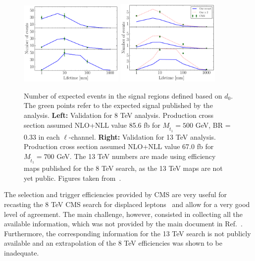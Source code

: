 \begin{figure}[ht]
\centering
\includegraphics[width=0.45\textwidth,angle=0]{ch5-figures/disp_lep_8tev.pdf}
\includegraphics[width=0.45\textwidth,angle=0]{ch5-figures/disp_lep_13tev.pdf}


\caption{\label{fig:ch5-valid1} Number of expected events in the signal regions defined based on $d_0$.  The green points refer to the expected signal published by the analysis. {\bf Left:} Validation for 8 TeV analysis.  Production cross section assumed NLO+NLL value 85.6 fb for $M_{\tilde t_1} = 500$ GeV, BR = 0.33 in each $\ell$-channel. {\bf Right:} Validation for 13 TeV analysis. Production cross section assumed NLO+NLL value 67.0 fb for $M_{\tilde t_1} = 700$ GeV. The 13 TeV numbers are made using efficiency maps published for the 8 TeV search, as the 13 TeV maps are not yet public. Figures taken from~\cite{LesHouches2017}.}
\end{figure}

\vskip 0.1in
\vskip 0.1in

The selection and trigger efficiencies provided by CMS
are very useful for recasting the 8 TeV CMS search for
displaced leptons~\cite{Khachatryan:2014mea}
and allow for a very good level of agreement.
The main challenge, however, consisted in collecting all the available
information, which was not provided by the main document in
Ref.~\cite{Khachatryan:2014mea}.
Furthermore, the corresponding information for the 13 TeV search is
not publicly available and an extrapolation of the 8 TeV efficiencies
was shown to be inadequate.

